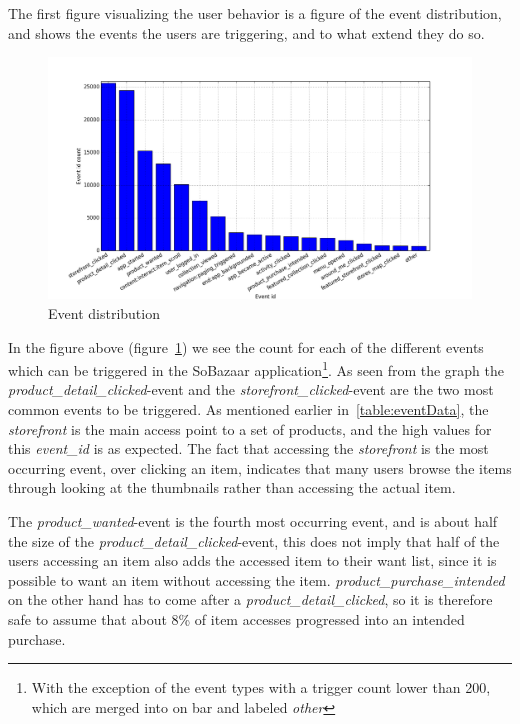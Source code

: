     The first figure visualizing the user behavior is a figure of the event distribution, and shows the events the users are triggering, and to what extend they do so.
    \begin{figure}[H]
        \includegraphics[width=5in]{image/event_iddistribution.png}
        \centering
        \caption{Event distribution}
    \label{figure:eventIDDistribution}
    \end{figure}
        In the figure above (figure~\ref{figure:eventIDDistribution}) we see the count for each of the different events which can be triggered in the SoBazaar application\footnote{With the exception of the event types with a trigger count lower than 200, which are merged into on bar and labeled \emph{other}}.
        As seen from the graph the \emph{product\_detail\_clicked}-event and the \emph{storefront\_clicked}-event are the two most common events to be triggered.
        As mentioned earlier in~\ref{table:eventData}, the \emph{storefront} is the main access point to a set of products, and the high values for this \emph{event\_id} is as expected.
        The fact that accessing the \emph{storefront} is the most occurring event, over clicking an item, indicates that many users browse the items through looking at the thumbnails rather than accessing the actual item.

        The \emph{product\_wanted}-event is the fourth most occurring event, and is about half the size of the \emph{product\_detail\_clicked}-event, this does not imply that half of the users accessing an item also adds the accessed item to their want list, since it is possible to want an item without accessing the item.
        \emph{product\_purchase\_intended} on the other hand has to come after a \emph{product\_detail\_clicked}, so it is therefore safe to assume that about 8\% of item accesses progressed into an intended purchase.

